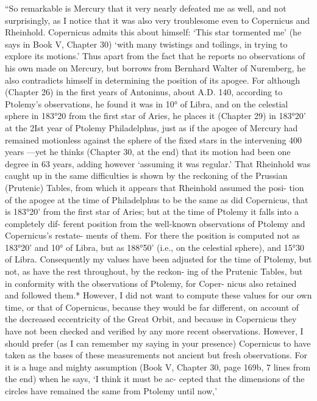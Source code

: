 \documentclass{article}
\begin{document}
{{{{{{{{{{{{{{{{{{{{{{{{{{{{{{{{{{{{{{{{{{{{{{{{{{{{{{{{{{{{{{{{{{{{{{{{{{{{{{{{{{{{{{{{{{{{{{{{{{{{{{{{{{{{{{{{{{{{{{{{{{{{{{{{{{{{{{{{{{{{{{{{{{{{{{{{{{“So remarkable is Mercury that it very nearly defeated me as well, and not surprisingly,
as I notice that it was also very troublesome even to Copernicus and Rheinhold. Copernicus
admits this about himself: ‘This star tormented me’ (he says in Book V, Chapter 30) ‘with
many twistings and toilings, in trying to explore its motions.’ Thus apart from the fact that
he reports no observations of his own made on Mercury, but borrows from Bernhard
Walter of Nuremberg, he also contradicts himself in determining the position of its apogee.
For although (Chapter 26) in the first years of Antoninus, about A.D. 140, according to
Ptolemy's observations, he found it was in 10° of Libra, and on the celestial sphere in
183°20 from the first star of Aries, he places it (Chapter 29) in 183°20’ at the 2Ist year of
Ptolemy Philadelphus, just as if the apogee of Mercury had remained motionless against
the sphere of the fixed stars in the intervening 400 years —yet he thinks (Chapter 30, at the
end) that its motion had been one degree in 63 years, adding however ‘assuming it was
regular.’ That Rheinhold was caught up in the same difficulties is shown by the reckoning
of the Prussian (Prutenic) Tables, from which it appears that Rheinhold assumed the posi-
tion of the apogee at the time of Philadelphus to be the same as did Copernicus, that is
183°20' from the first star of Aries; but at the time of Ptolemy it falls into a completely dif-
ferent position from the well-known observations of Ptolemy and Copernicus’s restate-
ments of them. For there the position is computed not as 183°20' and 10° of Libra, but as
188°50’ (i.e., on the celestial sphere), and 15°30 of Libra. Consequently my values have
been adjusted for the time of Ptolemy, but not, as have the rest throughout, by the reckon-
ing of the Prutenic Tables, but in conformity with the observations of Ptolemy, for Coper-
nicus also retained and followed them.* However, I did not want to compute these values
for our own time, or that of Copernicus, because they would be far different, on account of
the decreased eccentricity of the Great Orbit, and because in Copernicus they have not been
checked and verified by any more recent observations. However, I should prefer (as I can
remember my saying in your presence) Copernicus to have taken as the bases of these
measurements not ancient but fresh observations. For it is a huge and mighty assumption
(Book V, Chapter 30, page 169b, 7 lines from the end) when he says, ‘I think it must be ac-
cepted that the dimensions of the circles have remained the same from Ptolemy until now,’
}}}}}}}}}}}}}}}}}}}}}}}}}}}}}}}}}}}}}}}}}}}}}}}}}}}}}}}}}}}}}}}}}}}}}}}}}}}}}}}}}}}}}}}}}}}}}}}}}}}}}}}}}}}}}}}}}}}}}}}}}}}}}}}}}}}}}}}}}}}}}}}}}}}}}}}}}}
\end{document}
